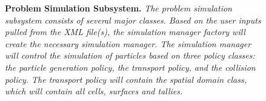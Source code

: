\begin{figure}[t!]
  \begin{center}
  \end{center}
  \caption{\textbf{Problem Simulation Subsystem.}
    \textit{The problem simulation subsystem consists of several major classes.
      Based on the user inputs pulled from the XML file(s), the simulation
      manager factory will create the necessary simulation manager. The 
      simulation manager will control the simulation of particles based on
      three policy classes: the particle generation policy, the transport
      policy, and the collision policy. The transport policy will contain
      the spatial domain class, which will contain all cells, surfaces and
      tallies.}}
  \label{fig:problem_simulator}
\end{figure}
